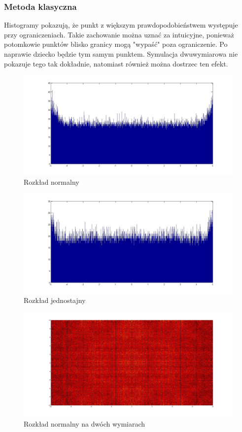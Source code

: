 \documentclass{mini}
\begin{document}
\subsubsection*{Metoda klasyczna}
Histogramy pokazują, że punkt z większym prawdopodobieństwem występuje przy ograniczeniach. Takie zachowanie można uznać za intuicyjne, ponieważ potomkowie punktów blisko granicy mogą "wypaść" poza ograniczenie. Po naprawie dziecko będzie tym samym punktem. Symulacja dwuwymiarowa nie pokazuje tego tak dokładnie, natomiast również można dostrzec ten efekt.
\begin{figure}[H]
\centering
\includegraphics[width=\textwidth]{c_n_20M_1__5_5_2}
\caption{Rozkład normalny}
\end{figure}

\begin{figure}[H]
\centering
\includegraphics[width=\textwidth]{c_j_2M_1__5_5}
\caption{Rozkład jednostajny}
\end{figure}

\begin{figure}[H]
\centering
\includegraphics[width=\textwidth]{c_n_10M_2__20_20__10_10_4}
\caption{Rozkład normalny na dwóch wymiarach}
\end{figure}
\end{document}
